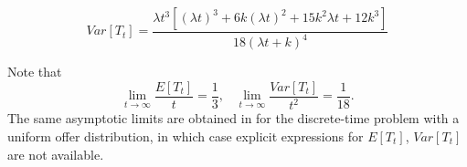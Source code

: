 \documentclass{article}
\numberwithin{equation}{section}
\begin{document}
%
%
%
%
$$Var[T_t]=\frac{\lambda t^3[(\lambda t)^3+6k(\lambda t)^2+15k^2\lambda t+12k^3]}{18(\lambda t+k)^4}$$







%
Note that 
\begin{equation}\label{atu}\lim_{t\rightarrow \infty}\frac{E[T_t]}{t}=\frac{1}{3},\;\;\;\lim_{t\rightarrow \infty}\frac{Var[T_t]}{t^2}=\frac{1}{18}.\end{equation}
The same asymptotic limits are obtained in \cite{Mazalov} for the discrete-time problem with a uniform offer distribution, in which case explicit 
expressions for $E[T_t]$, $Var[T_t]$ are not available.
\end{document}
